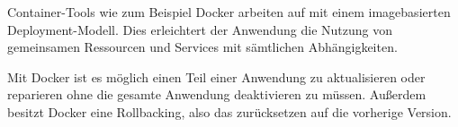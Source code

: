 Container-Tools wie zum Beispiel Docker arbeiten auf mit einem imagebasierten Deployment-Modell. Dies erleichtert der Anwendung die Nutzung von gemeinsamen Ressourcen und Services mit sämtlichen Abhängigkeiten.

Mit Docker ist es möglich einen Teil einer Anwendung zu aktualisieren oder reparieren ohne die gesamte Anwendung deaktivieren zu müssen. Außerdem besitzt Docker eine Rollbacking, also das zurücksetzen auf die vorherige Version.

\cite{Vorteile_Nachteile_Docker}
\cite{Was_ist_Docker}




